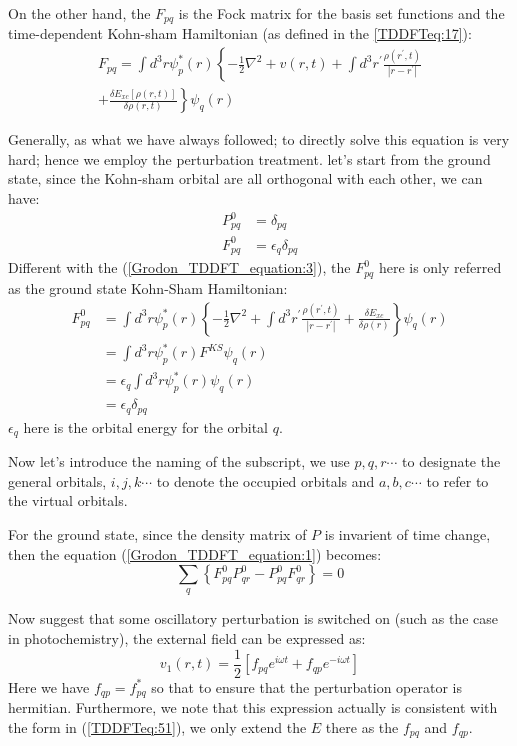 On the other hand, the $F_{pq}$ is the Fock matrix for the basis set
functions and the time-dependent Kohn-sham Hamiltonian (as defined
in the \ref{TDDFTeq:17}):
\begin{multline}
\label{Grodon_TDDFT_equation:3}
F_{pq} = 
\int d^{3}r\psi^{*}_{p}(r)\left\{ -\frac{1}{2}\nabla^{2} + v(r,t) +
\int d^{3}r^{'}\frac{\rho(r^{'}, t)}{|r-r^{'}|} \right. \\
\left. + \frac{\delta
E_{xc}[\rho(r,t)]}{\delta\rho(r,t)} \right\}\psi_{q}(r)
\end{multline}

Generally, as what we have always followed; to directly solve this
equation is very hard; hence we employ the perturbation treatment.
let's start from the ground state, since the Kohn-sham orbital are
all orthogonal with each other, we can have:
\begin{align}
 \label{Grodon_TDDFT_equation:4}
P^{0}_{pq} &= \delta_{pq} \nonumber \\
F^{0}_{pq} &= \epsilon_{q}\delta_{pq} 
\end{align}
Different with the (\ref{Grodon_TDDFT_equation:3}), the $F^{0}_{pq}$
here is only referred as the ground state Kohn-Sham Hamiltonian:
\begin{align}\label{Grodon_TDDFT_equation:12}
F^{0}_{pq} &= 
\int d^{3}r\psi^{*}_{p}(r)\left\{ -\frac{1}{2}\nabla^{2} +
\int d^{3}r^{'}\frac{\rho(r^{'}, t)}{|r-r^{'}|}  + \frac{\delta
E_{xc}}{\delta\rho(r)} \right\}\psi_{q}(r) \nonumber \\
&=\int d^{3}r\psi^{*}_{p}(r) F^{KS}\psi_{q}(r) \nonumber \\
&=\epsilon_{q}\int d^{3}r\psi^{*}_{p}(r)\psi_{q}(r) \nonumber \\
&=\epsilon_{q}\delta_{pq}
\end{align}
$\epsilon_{q}$ here is the orbital energy for the orbital $q$.

Now let's introduce the naming of the subscript, we use $p,q,r\cdots$
to designate the general orbitals, $i,j,k\cdots$ to denote the
occupied orbitals and $a,b,c\cdots$ to refer to the virtual orbitals.

For the ground state, since the density matrix of $P$ is invarient of
time change, then the equation (\ref{Grodon_TDDFT_equation:1})
becomes:
\begin{equation}\label{Grodon_TDDFT_equation:5}
\sum_{q}\left\{F^{0}_{pq}P^{0}_{qr} -
P^{0}_{pq}F^{0}_{qr}\right\} = 0
\end{equation}

Now suggest that some oscillatory perturbation is switched on (such
as the case in photochemistry), the external field can be expressed
as:
\begin{equation}\label{Grodon_TDDFT_equation:6}
v_{1}(r,t) = \frac{1}{2}\left[ f_{pq}e^{i\omega t} + f_{qp}e^{-i\omega
t}\right] 
\end{equation}
Here we have $f_{qp} = f^{*}_{pq}$ so that to ensure that the
perturbation operator is hermitian. Furthermore, we note that this
expression actually is consistent with the form in
(\ref{TDDFTeq:51}), we only extend the $E$ there as the $f_{pq}$ and
$f_{qp}$.

